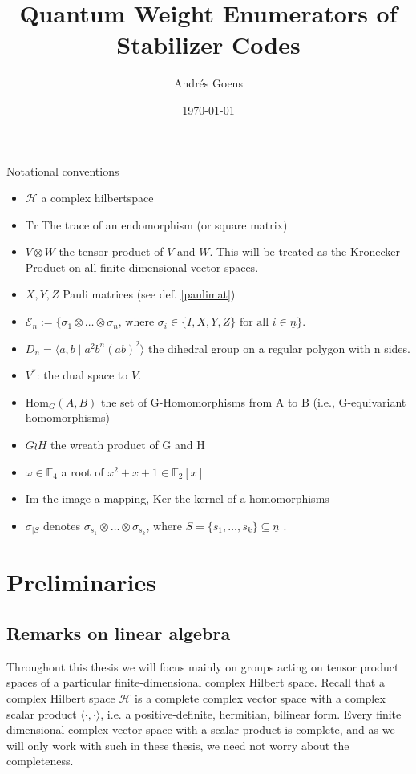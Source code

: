 \documentclass{article}
\title{Quantum Weight Enumerators of Stabilizer Codes}
\author{Andr\'{e}s Goens}
\date{\today}
\def\F{\mathbb{F}}
\def\n{\underline{n}}
\def\Hom{\text{Hom}}
\def\fa{\text{ for all }}
\def\Tr{\text{Tr}}
\theoremstyle{definition}
\begin{document}
Notational conventions

\begin{itemize}
\item $\mathcal{H}$ a complex hilbertspace
\item $\Tr$ The trace of an endomorphism (or square matrix)
\item $V \otimes W$ the tensor-product of $V$ and $W$. This will be treated as the Kronecker-Product on all finite dimensional vector spaces.
\item $X, Y, Z$ Pauli matrices (see def. \ref{paulimat})
\item $\mathcal{E}_n:= \{ \sigma_1 \otimes \ldots \otimes \sigma_n \text{, where }\sigma_i \in \{ I,X,Y,Z \} \fa i \in \n \}$.
\item $D_n = \langle a, b \mid a^2 b^n (ab)^2 \rangle$ the dihedral group on a regular polygon with n sides.
\item $V^*$: the dual space to $V$.

\item $\Hom_{G}(A,B)$ the set of G-Homomorphisms from A to B (i.e., G-equivariant homomorphisms)
\item $ G \wr H$ the wreath product of G and H
\item $ \omega \in \F_4$ a root of $x^2 + x + 1 \in \F_2[x]$
\item Im the image a mapping, Ker the kernel of a homomorphisms
\item $\sigma_{\big| S}$ denotes $\sigma_{s_1} \otimes \ldots \otimes \sigma_{s_k}$, where $S = \{ s_1, \ldots, s_k \} \subseteq \n$ .
\end{itemize}

\clearpage \newpage
\tableofcontents
\clearpage \newpage

\section{Preliminaries}

\subsection{ Remarks on linear algebra}
Throughout this thesis we will focus mainly on groups acting on tensor product spaces of a particular finite-dimensional complex Hilbert space. Recall that a complex Hilbert space $\mathcal{H}$ is a complete complex vector space with a complex scalar product $\langle \cdot , \cdot \rangle$, i.e. a positive-definite, hermitian, bilinear form. Every finite dimensional complex vector space with a scalar product is complete, and as we will only work with such in these thesis, we need not worry about the completeness.
\end{document}
